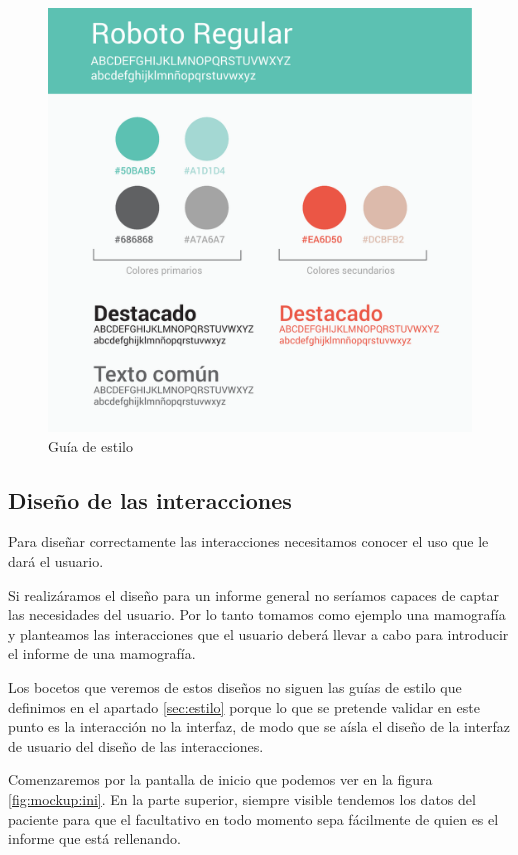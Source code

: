 \begin{figure}[ht]
\centering
\includegraphics[scale=0.7]{./imgs/ui/estilo.pdf}
\caption{Guía de estilo}
\label{fig:estilo}
\end{figure}

\subsection{Diseño de las interacciones}\label{sec:ui-mockup}
Para diseñar correctamente las interacciones necesitamos conocer  el uso que le dará  el usuario.\par
Si realizáramos el diseño para un informe general no seríamos capaces de captar las necesidades del usuario. Por lo tanto tomamos como ejemplo una mamografía y planteamos las interacciones que el usuario deberá llevar a cabo para introducir el informe de una mamografía.\par
Los bocetos que veremos de estos diseños no siguen las guías de estilo que definimos en el apartado \ref{sec:estilo} porque lo que se pretende validar en este punto es la interacción no la interfaz, de modo que se aísla el diseño de la interfaz de usuario del diseño de las interacciones.\medskip\par
Comenzaremos por la pantalla de inicio que podemos ver en la figura \ref{fig:mockup:ini}. En la parte superior, siempre visible tendemos los datos del paciente para que el facultativo en todo momento sepa fácilmente de quien es el informe que está rellenando.\par

